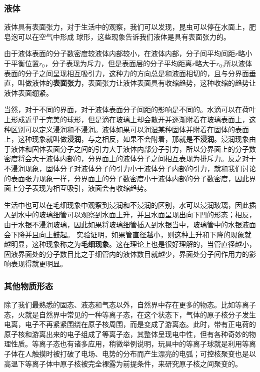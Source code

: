 \subsubsection{液体}
液体具有表面张力，对于生活中的观察，我们可以发现，昆虫可以停在水面上，肥皂泡可以在空气中形成 球形，这些现象告诉我们液体是具有表面张力的。

由于液体表面的分子数密度较液体内部较小，在液体内部，分子间平均间距$r$略小于平衡位置$r_0$，分子表现为斥力，但是表面层的分子平均距离$r$略大于$r_0$,所以液体表面的分子之间呈现相互吸引力，这种力的方向总是和液面相切的，且与分界面垂直，叫做液体的\textbf{表面张力}，表面张力让液体表面具有收缩趋势，这种收缩的趋势让液体表面绷紧。

当然，对于不同的界面，对于液体表面分子间距的影响是不同的。水滴可以在荷叶上形成近乎于完美的球形，但是滴在玻璃上却会散开并逐渐附着在玻璃表面上，这种区别可以定义浸润和不浸润。液体如果可以润湿某种固体并附着在固体的表面上，这种现象就叫做\textbf{浸润}，与之相反，如果不会附着，那就是\textbf{不浸润}。浸润现象由于液体和固体表面分子之间的引力大于液体内部分子引力，所以分界面上的分子数密度将会大于液体内部的，分界面上的液体分子之间相互表现为排斥力。反之对于不浸润现象，固体分子对液体分子的引力小于液体分子内部的引力，就和我们讨论的表面张力现象一样，分界面上的分子数密度小于液体内部的分子数密度，因此界面上分子表现为相互吸引，液面会有收缩趋势。

生活中也可以在毛细现象中观察到浸润和不浸润的区别，水可以浸润玻璃，因此插入到水中的玻璃细管可以观察到水面上升，并且水面呈现出向下凹的形态；相反，由于水银不浸润玻璃，因此如果将玻璃细管插入到水银当中，玻璃管中的水银液面会下降并且向上鼓起。%
实验证明，如果管直径越小，则这种上升和下降的现象就越明显，这种现象称之为\textbf{毛细现象}。这在理论上也是很好理解的，当管直径越小，固液界面处的分子数目比之于细管内的液体数目就越少，界面处分子间作用力的影响表现得就更明显。

\subsubsection{其他物质形态}
除了我们最熟悉的固态、液态和气态以外，自然界中存在更多的物态。比如等离子态，火就是自然界中常见的一种等离子态，在这个状态下，气体的原子核分子发生电离，电子不再紧紧围绕在原子核周围，而是变成了游离态。此时，带有正电荷的原子核和游离出来的电子组成了等离子态，其整体呈现电中性，但有各种奇妙的物理性质。等离子态也有诸多应用，稍微举例说明，玩具中的等离子球就是利用等离子体在人触摸时被打破了电场、电势的分布而产生漂亮的电弧；可控核聚变也是以高温下等离子体中原子核被完全裸露为前提条件，来研究原子核之间聚变的。

